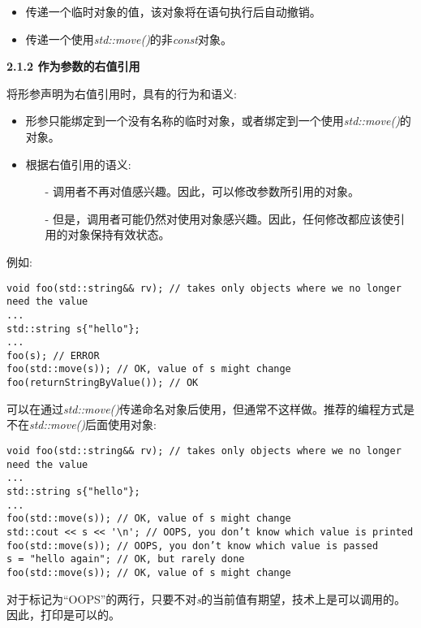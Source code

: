 \begin{itemize}
	\item 传递一个临时对象的值，该对象将在语句执行后自动撤销。
	\item 传递一个使用\textit{std::move()}的非\textit{const}对象。
\end{itemize}

\hspace*{\fill} \par %
\textbf{2.1.2 作为参数的右值引用}

将形参声明为右值引用时，具有的行为和语义:\par

\begin{itemize}
	\item 形参只能绑定到一个没有名称的临时对象，或者绑定到一个使用\textit{std::move()}的对象。
	\item 根据右值引用的语义:
	\begin{itemize}
		\item[-] 调用者不再对值感兴趣。因此，可以修改参数所引用的对象。
		\item[-] 但是，调用者可能仍然对使用对象感兴趣。因此，任何修改都应该使引用的对象保持有效状态。
	\end{itemize}	
\end{itemize}

例如:\par

\begin{lstlisting}[caption={}]
void foo(std::string&& rv); // takes only objects where we no longer need the value
...
std::string s{"hello"};
...
foo(s); // ERROR
foo(std::move(s)); // OK, value of s might change
foo(returnStringByValue()); // OK
\end{lstlisting}

可以在通过\textit{std::move()}传递命名对象后使用，但通常不这样做。推荐的编程方式是不在\textit{std::move()}后面使用对象:\par

\begin{lstlisting}[caption={}]
void foo(std::string&& rv); // takes only objects where we no longer need the value
...
std::string s{"hello"};
...
foo(std::move(s)); // OK, value of s might change
std::cout << s << '\n'; // OOPS, you don’t know which value is printed
foo(std::move(s)); // OOPS, you don’t know which value is passed
s = "hello again"; // OK, but rarely done
foo(std::move(s)); // OK, value of s might change
\end{lstlisting}

对于标记为“OOPS”的两行，只要不对\textit{s}的当前值有期望，技术上是可以调用的。因此，打印是可以的。\par




